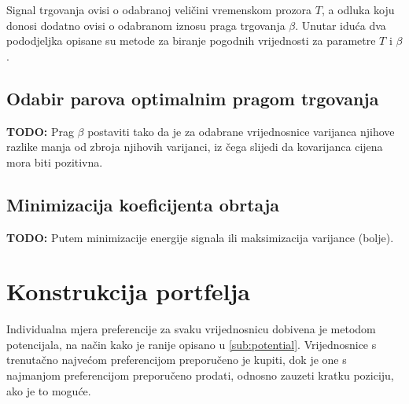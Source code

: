 \documentclass[lmodern, utf8, diplomski, numeric]{fer}
\newcommand{\todo}{\textbf{TODO: }}
\begin{document}
  Signal trgovanja ovisi o odabranoj veličini vremenskom prozora $T$, a odluka koju donosi dodatno ovisi o odabranom iznosu praga trgovanja $\beta$.
  Unutar iduća dva pododjeljka opisane su metode za biranje pogodnih vrijednosti za parametre $T$ i $\beta$.
  
  \subsection{Odabir parova optimalnim pragom trgovanja}
  \todo
  Prag $\beta$ postaviti tako da je za odabrane vrijednosnice varijanca njihove razlike manja od zbroja njihovih varijanci, iz čega slijedi da kovarijanca cijena mora biti pozitivna.

  \subsection{Minimizacija koeficijenta obrtaja} 
  \todo
  Putem minimizacije energije signala ili maksimizacija varijance (bolje).
  
  \section{Konstrukcija portfelja}
  Individualna mjera preferencije za svaku vrijednosnicu dobivena je metodom potencijala, na način kako je ranije opisano u \ref{sub:potential}.
  Vrijednosnice s trenutačno najvećom preferencijom preporučeno je kupiti, dok je one s najmanjom preferencijom preporučeno prodati, odnosno zauzeti kratku poziciju, ako je to moguće.
  
\end{document}
